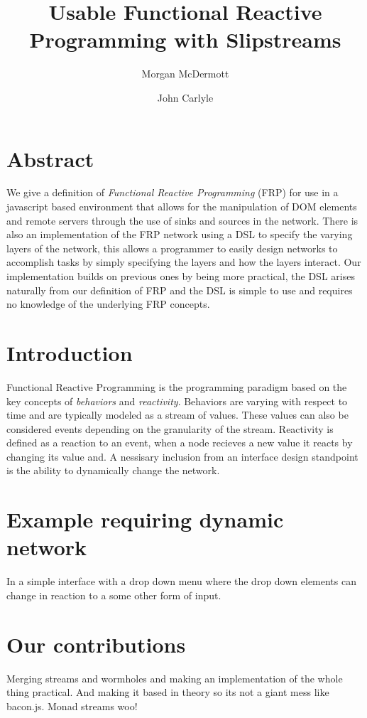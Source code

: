 \documentclass[twocolumn]{paper}
\title{Usable Functional Reactive Programming with Slipstreams}
\author[*]{Morgan McDermott}
\author[**]{John Carlyle}
\affil[*]{University of flightless dragons}
\affil[**]{University of angry bees}
\begin{document}
\maketitle

\section{Abstract}
\cite{ElliottHudak97:Fran}
We give a definition of \textit{Functional Reactive Programming} (FRP) for use in a javascript based environment that allows for the manipulation of DOM elements and remote servers through the use of sinks and sources in the network. There is also an implementation of the FRP network using a DSL to specify the varying layers of the network, this allows a programmer to easily design networks to accomplish tasks by simply specifying the layers and how the layers interact. Our implementation builds on previous ones by being more practical, the DSL arises naturally from our definition of FRP and the DSL is simple to use and requires no knowledge of the underlying FRP concepts.

\section{Introduction}
Functional Reactive Programming is the programming paradigm based on the key concepts of \textit{behaviors} and \textit{reactivity}. Behaviors are varying with respect to time and are typically modeled as a stream of values. These values can also be considered events depending on the granularity of the stream. Reactivity is defined as a reaction to an event, when a node recieves a new value it reacts by changing its value and. A nessisary inclusion from an interface design standpoint is the ability to dynamically change the network. 

\section{Example requiring dynamic network}
In a simple interface with a drop down menu where the drop down elements can change in reaction to a some other form of input. 

\section{Our contributions}
Merging streams and wormholes and making an implementation of the whole thing practical. And making it based in theory so its not a giant mess like bacon.js. Monad streams woo!
\end{document}
